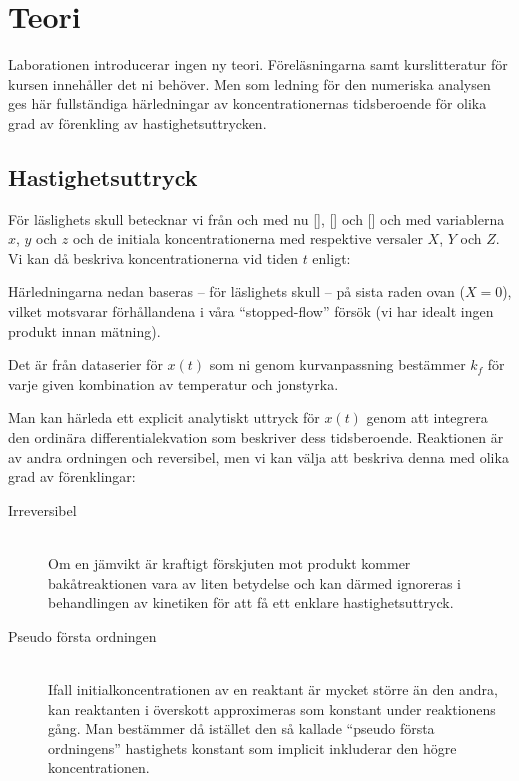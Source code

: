 \section{Teori}
\label{sec:teori}
Laborationen introducerar ingen ny teori. Föreläsningarna samt
kurslitteratur för kursen innehåller det ni behöver. Men som ledning för
den numeriska analysen ges här fullständiga härledningar av
koncentrationernas tidsberoende för olika grad av förenkling av
hastighetsuttrycken.

\subsection{Hastighetsuttryck}
För läslighets skull betecknar vi från och med nu [],
[] och [] och med variablerna $x$, $y$ och $z$ och de
initiala koncentrationerna med respektive versaler $X$, $Y$ och $Z$. Vi
kan då beskriva koncentrationerna vid tiden $t$ enligt:



Härledningarna nedan baseras -- för läslighets skull -- på sista raden
ovan ($X=0$), vilket motsvarar förhållandena i våra ``stopped-flow'' försök (vi har
idealt ingen produkt innan mätning).

Det är från dataserier för $x(t)$ som ni genom kurvanpassning
bestämmer $k_f$ för varje given kombination av temperatur och
jonstyrka.

Man kan härleda ett explicit analytiskt uttryck för $x(t)$ genom att
integrera den ordinära differentialekvation som beskriver dess
tidsberoende. Reaktionen är av andra ordningen och reversibel, men vi kan
välja att beskriva denna med olika grad av förenklingar:
\begin{description}
\item[Irreversibel] \hfill \\
  Om en jämvikt är kraftigt förskjuten mot produkt kommer
  bakåtreaktionen vara av liten betydelse och kan därmed
  ignoreras i behandlingen av kinetiken för att få
  ett enklare hastighetsuttryck.
\item[Pseudo första ordningen] \hfill \\ %
  Ifall initialkoncentrationen av en reaktant är mycket större än den andra,
  kan reaktanten i överskott approximeras som konstant under reaktionens
  gång. Man bestämmer då istället den så kallade ``pseudo första ordningens''
  hastighets konstant som implicit inkluderar den högre koncentrationen.
\end{description}

